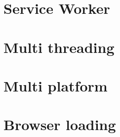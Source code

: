 	\section{Service Worker}

	\section{Multi threading}

	\section{Multi platform}

	\section{Browser loading}


%